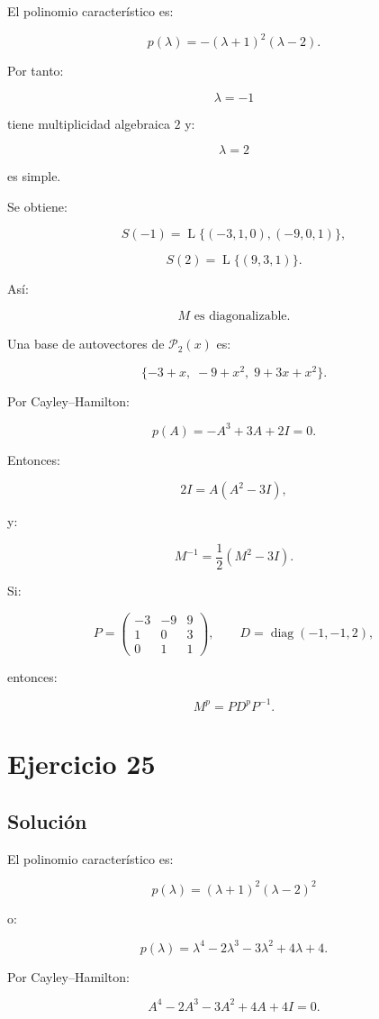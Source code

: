 \documentclass[11pt,a4paper]{article}
\newcommand{\diag}{\operatorname{diag}}
\newcommand{\Span}{\operatorname{L}}
\begin{document}
El polinomio característico es:

\[
p(\lambda)
=
-(\lambda+1)^2(\lambda-2).
\]

Por tanto:

\[
\lambda=-1
\]

tiene multiplicidad algebraica $2$ y:

\[
\lambda=2
\]

es simple.

Se obtiene:

\[
S(-1)
=
\Span\{(-3,1,0),(-9,0,1)\},
\]

\[
S(2)
=
\Span\{(9,3,1)\}.
\]

Así:

\[
\boxed{
M\text{ es diagonalizable.}
}
\]

Una base de autovectores de $\mathcal P_2(x)$ es:

\[
\boxed{
\{-3+x,\;-9+x^2,\;9+3x+x^2\}.
}
\]

Por Cayley--Hamilton:

\[
p(A)
=
-A^3+3A+2I=0.
\]

Entonces:

\[
2I=A(A^2-3I),
\]

y:

\[
\boxed{
M^{-1}
=
\frac12(M^2-3I).
}
\]

Si:

\[
P=
\begin{pmatrix}
-3&-9&9\\
1&0&3\\
0&1&1
\end{pmatrix},
\qquad
D=
\diag(-1,-1,2),
\]

entonces:

\[
\boxed{
M^p
=
PD^pP^{-1}.
}
\]

\section{Ejercicio 25}
\subsection{Solución}

El polinomio característico es:

\[
p(\lambda)
=
(\lambda+1)^2(\lambda-2)^2
\]

o:

\[
p(\lambda)
=
\lambda^4-2\lambda^3-3\lambda^2+4\lambda+4.
\]

Por Cayley--Hamilton:

\[
A^4-2A^3-3A^2+4A+4I=0.
\]
\end{document}
